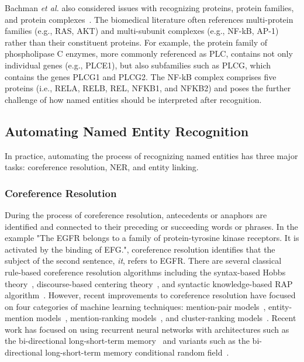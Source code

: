 Bachman \textit{et al.} also considered issues with recognizing proteins, protein families, and protein complexes~\cite{Bachman2018}.
The biomedical literature often references multi-protein families (e.g., RAS, AKT) and multi-subunit complexes (e.g., NF-kB, AP-1) rather than their constituent proteins.
For example, the protein family of phospholipase C enzymes, more commonly referenced as PLC, contains not only individual genes (e.g., PLCE1), but also subfamilies such as PLCG, which contains the genes PLCG1 and PLCG2.
The NF-kB complex comprises five proteins (i.e., RELA, RELB, REL, NFKB1, and NFKB2) and poses the further challenge of how named entities should be interpreted after recognition.

\subsection{Automating Named Entity Recognition}

In practice, automating the process of recognizing named entities has three major tasks: coreference resolution, \ac{NER}, and entity linking.

\subsubsection*{Coreference Resolution}

During the process of coreference resolution, antecedents or anaphors are identified and connected to their preceding or succeeding words or phrases.
In the example "The EGFR belongs to a family of protein-tyrosine kinase receptors. It is activated by the binding of EFG.", coreference resolution identifies that the subject of the second sentence, \textit{it}, refers to EGFR.
There are several classical rule-based coreference resolution algorithms including the syntax-based Hobbs theory~\cite{Hobbs1978}, discourse-based centering theory~\cite{Brennan1987}, and syntactic knowledge-based RAP algorithm~\cite{Brennan1987}.
However, recent improvements to coreference resolution have focused on four categories of machine learning techniques: mention-pair models~\cite{Soon2001,Ng2002,Bengtson2008}, entity-mention models~\cite{Luo2004,Yang2004,Yang2008}, mention-ranking models~\cite{Lee2011,Denis2007,Rahman2009,martschat2015}, and cluster-ranking models~\cite{Rahman2011,Ma2014,Clark2016}.
Recent work has focused on using recurrent neural networks with architectures such as the bi-directional long-short-term memory~\cite{Li2018} and variants such as the bi-directional long-short-term memory conditional random field~\cite{Giorgi526244}.

